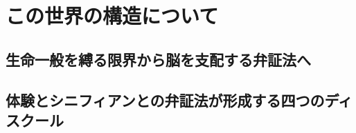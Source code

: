 





\frontmatter

\tableofcontents %

\mainmatter

\part{この世界の構造について}


\newpage


\newpage

\chapter{生命一般を縛る限界から脳を支配する弁証法へ}


\newpage



\newpage



\newpage


\chapter{体験とシニフィアンとの弁証法が形成する四つのディスクール}


\newpage



\newpage



\newpage



\newpage



\newpage



\newpage


